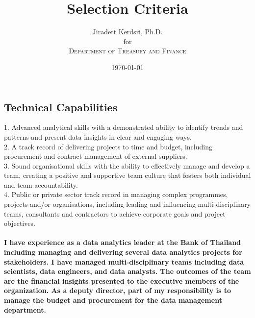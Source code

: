 \documentclass[12pt]{article}
\title{Selection Criteria } %
\author{Jiradett Kerdsri, Ph.D.\\ %
for\\ %
\textsc{Department of Treasury and Finance}
}
\date{\today} %
\begin{document}
\setlength{\droptitle}{-5em}    
\maketitle



\subsection*{Technical Capabilities}
1.	Advanced analytical skills with a demonstrated ability to identify trends and patterns and present data insights in clear and engaging ways.
\\2.	A track record of delivering projects to time and budget, including procurement and contract management of external suppliers. 
\\3.	Sound organisational skills with the ability to effectively manage and develop a team, creating a positive and supportive team culture that fosters both individual and team accountability.
\\4.	Public or private sector track record in managing complex programmes, projects and/or organisations, including leading and influencing multi-disciplinary teams, consultants and contractors to achieve corporate goals and project objectives.\\
{\bfseries \\I have experience as a data analytics leader at the Bank of Thailand including managing and delivering several data analytics projects for stakeholders. I have managed multi-disciplinary teams including data scientists, data engineers, and data analysts. The outcomes of the team are the financial insights presented to the executive members of the organization. As a deputy director, part of my responsibility is to manage the budget and procurement for the data management department.}
\end{document}
